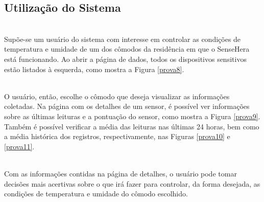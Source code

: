 \subsection{Utilização do Sistema}
\label{subsec:utilizacao}
\\\null \quad Supõe-se um usuário do sistema com interesse em controlar as condições de temperatura e umidade de um dos cômodos da residência em que o SenseHera está funcionando. Ao abrir a página de dados, todos os dispositivos sensitivos estão listados à esquerda, como mostra a Figura \ref{prova8}.


\\\null \quad O usuário, então, escolhe o cômodo que deseja visualizar as informações coletadas. Na página com os detalhes de um sensor, é possível ver informações sobre as últimas leituras e a pontuação do sensor, como mostra a Figura \ref{prova9}. Também é possível verificar a média das leituras nas últimas 24 horas, bem como a média histórica dos registros, respectivamente, nas Figuras \ref{prova10} e \ref{prova11}.
\newpage
{}

\newpage


\\\null \quad Com as informações contidas na página de detalhes, o usuário pode tomar decisões mais acertivas sobre o que irá fazer para controlar, da forma desejada, as condições de temperatura e umidade do cômodo escolhido.


